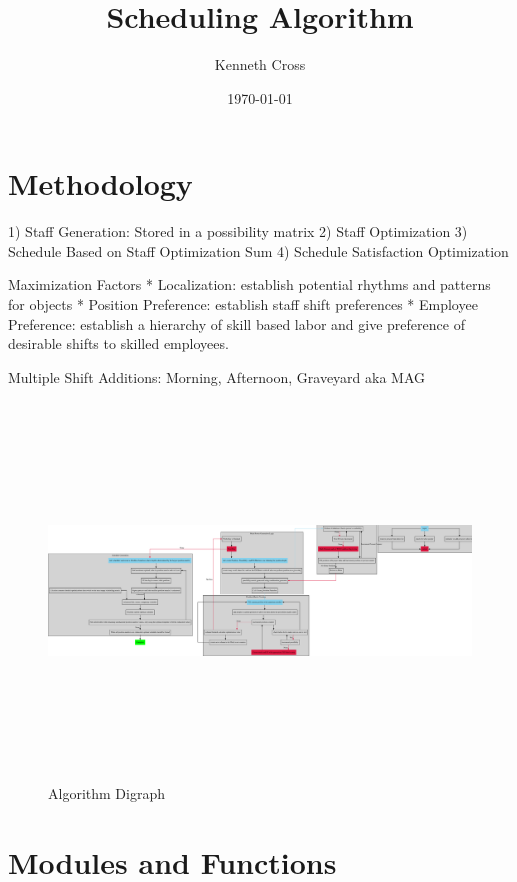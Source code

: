 \documentclass[a4paper,11pt]{article}
\author{Kenneth Cross}
\title{\textbf{Scheduling Algorithm}}
\date{\today}
\begin{document}
\maketitle
\newpage
\tableofcontents
\newpage
{}
\setcounter{page}{1}

\newpage

\section{Methodology}

1) Staff Generation: Stored in a possibility matrix
2) Staff Optimization
3) Schedule Based on Staff Optimization Sum
4) Schedule Satisfaction Optimization

Maximization Factors
* Localization: establish potential rhythms and patterns for objects
* Position Preference: establish staff shift preferences
* Employee Preference: establish a hierarchy of skill based labor and give preference of desirable shifts to skilled employees. 

Multiple Shift Additions: Morning, Afternoon, Graveyard aka MAG

\begin{figure}
    \includegraphics[height=10cm]{graph.eps}
    \caption{\small Algorithm Digraph}
\end{figure}

\section{Modules and Functions}
\end{document}
